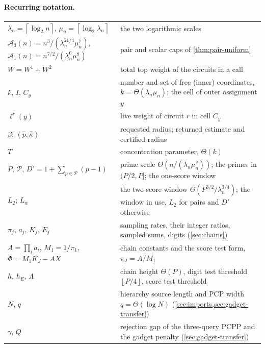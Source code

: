 \documentclass[11pt,letterpaper]{article}
\theoremstyle{definition}
\theoremstyle{remark}
\newcommand{\ceil}[1]{\left\lceil #1\right\rceil}
\newcommand{\floor}[1]{\left\lfloor #1\right\rfloor}
\newcommand{\cP}{\mathcal P}
\newcommand{\lgx}{\log_2}
\begin{document}
\paragraph{Recurring notation.}
\begin{center}\small
\begin{tabularx}{\textwidth}{@{}>{\raggedright\arraybackslash}p{}X@{}}
\toprule
\(\lambda_n=\ceil{\lgx n}\), \(\mu_n=\ceil{\lgx\lambda_n}\) & the two logarithmic scales\\
\(\mathcal A_3(n)=n^3/(\lambda_n^{21/4}\mu_n^7)\), \(\mathcal A_1(n)=n^{7/2}/(\lambda_n^6\mu_n^8)\) & pair and scalar caps of \cref{thm:pair-uniform}\\
\(W=W^1+W^2\) & total top weight of the circuits in a call\\
\(k\), \(I\), \(C_y\) & number and set of free (inner) coordinates, \(k=\Theta(\lambda_n\mu_n)\); the cell of outer assignment \(y\)\\
\(\ell^r(y)\) & live weight of circuit \(r\) in cell \(C_y\)\\
\(\beta\); \((\widehat p,\widehat\kappa)\) & requested radius; returned estimate and certified radius\\
\(T\) & concentration parameter, \(\Theta(k)\)\\
\(P\), \(\cP\), \(D'=1+\sum_{p\in\cP}(p-1)\) & prime scale \(\Theta(n/(\lambda_n\mu_n^2))\); the primes in \((P/2,P]\); the one-score window\\
\(L_2\); \(L_w\) & the two-score window \(\Theta(P^{3/2}/\lambda_n^{3/4})\); the window in use, \(L_2\) for pairs and \(D'\) otherwise\\
\(\pi_j\), \(a_j\), \(K_j\), \(E_j\) & sampling rates, their integer ratios, sampled sums, digits (\cref{sec:chains})\\
\(A=\prod_i a_i\), \(M_1=1/\pi_1\), \(\Phi=M_1K_J-AX\) & chain constants and the score test form, \(\pi_J=A/M_1\)\\
\(h\), \(h_E\), \(\Lambda\) & chain height \(\Theta(P)\), digit test threshold \(\floor{P/4}\), score test threshold\\
\(N\), \(q\) & hierarchy source length and PCP width \(q=\Theta(\log N)\) (\cref{sec:imports,sec:gadget-transfer})\\
\(\gamma\), \(Q\) & rejection gap of the three-query PCPP and the gadget penalty (\cref{sec:gadget-transfer})\\
\bottomrule
\end{tabularx}
\end{center}
\end{document}
